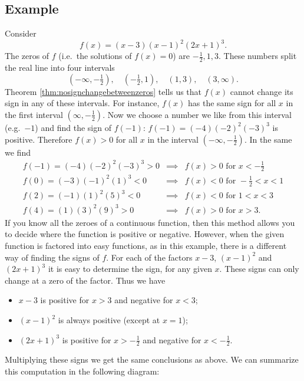 \subsection{Example}
Consider
\[
f(x) = (x-3)(x-1)^2(2x+1)^3.
\]
The zeros of $f$ (i.e.\ the solutions of $f(x)=0$) are $ -\frac12, 1, 3 $.
These numbers split the real line into four intervals
\[
(-\infty, -\tfrac12), \quad (-\tfrac12, 1), \quad (1, 3),\quad (3, \infty).
\]
Theorem \ref{thm:nosignchangebetweenzeros} tells us that $f(x)$ cannot change
its sign in any of these intervals.  For instance, $f(x)$ has the same sign for
all $x$ in the first interval $(\infty, -\frac12)$.  Now we choose a number we
like from this interval (e.g.~$-1$) and find the sign of $f(-1)$: $f(-1) =
(-4)(-2)^2(-3)^3$ is positive.  Therefore $f(x) >0$ for all $x$ in the interval
$(-\infty, -\tfrac12)$.  In the same we find
\begin{eqnarray*}
  f(-1) = (-4)(-2)^2(-3)^3>0 &\implies & f(x) >0 \text{ for } x<-\tfrac12\\
  f( 0) = (-3)(-1)^2( 1)^3<0 &\implies & f(x) <0 \text{ for } -\tfrac12<x<1\\
  f( 2) = (-1)( 1)^2( 5)^3<0 &\implies & f(x) <0 \text{ for } 1<x<3\\
  f( 4) = ( 1)( 3)^2( 9)^3>0 &\implies & f(x) >0 \text{ for } x>3.
\end{eqnarray*}
If you know all the zeroes of a continuous function, then this method allows you
to decide where the function is positive or negative.  However, when the given
function is factored into easy functions, as in this example, there is a
different way of finding the signs of $f$.  For each of the factors $x-3$,
$(x-1)^2$ and $(2x+1)^3$ it is easy to determine the sign, for any given $x$.
These signs can only change at a zero of the factor.  Thus we have
\begin{itemize}
\item $x-3$ is positive for $x>3$ and negative for $x<3$;
\item $(x-1)^2$ is always positive (except at $x=1$);
\item $(2x+1)^3$ is positive for $x>-\frac12$ and negative for $x<-\frac12$.
\end{itemize}
Multiplying these signs we get the same conclusions as above. We can summarize
this computation in the following diagram:
\begin{figure}[h]
  \centering\sffamily
  
\end{figure}




